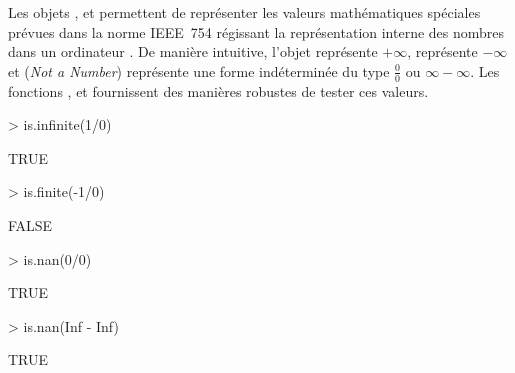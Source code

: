 Les objets ,  et  permettent de
représenter les valeurs mathématiques spéciales prévues dans la norme
IEEE~754 régissant la représentation interne des nombres dans un
ordinateur \citep{IEEE:754}. De manière intuitive, l'objet 
représente $+\infty$,  représente $-\infty$ et 
(\emph{Not a Number}) représente une forme indéterminée du type
$\frac{0}{0}$ ou $\infty - \infty$. Les fonctions
,  et 
fournissent des manières robustes de tester ces valeurs.
\begin{Schunk}
\begin{Sinput}
> is.infinite(1/0)
\end{Sinput}
\begin{Soutput}
[1] TRUE
\end{Soutput}
\begin{Sinput}
> is.finite(-1/0)
\end{Sinput}
\begin{Soutput}
[1] FALSE
\end{Soutput}
\begin{Sinput}
> is.nan(0/0)
\end{Sinput}
\begin{Soutput}
[1] TRUE
\end{Soutput}
\begin{Sinput}
> is.nan(Inf - Inf)
\end{Sinput}
\begin{Soutput}
[1] TRUE
\end{Soutput}
\end{Schunk}

